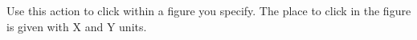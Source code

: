 
Use this action to click within a figure you specify. The place to click in the figure is given with X and Y units. 
